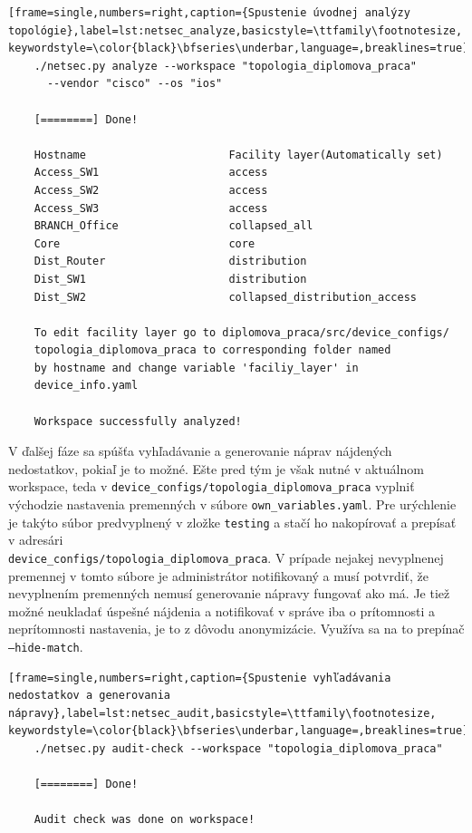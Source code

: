 \begin{minipage}{\linewidth}		
	\begin{lstlisting}[frame=single,numbers=right,caption={Spustenie úvodnej analýzy topológie},label=lst:netsec_analyze,basicstyle=\ttfamily\footnotesize, keywordstyle=\color{black}\bfseries\underbar,language=,breaklines=true]
	./netsec.py analyze --workspace "topologia_diplomova_praca" 
	  --vendor "cisco" --os "ios"
	
	[========] Done!
	
	Hostname                      Facility layer(Automatically set)
	Access_SW1                    access
	Access_SW2                    access
	Access_SW3                    access
	BRANCH_Office                 collapsed_all
	Core                          core
	Dist_Router                   distribution
	Dist_SW1                      distribution
	Dist_SW2                      collapsed_distribution_access
	
	To edit facility layer go to diplomova_praca/src/device_configs/
	topologia_diplomova_praca to corresponding folder named 
	by hostname and change variable 'faciliy_layer' in 
	device_info.yaml
	
	Workspace successfully analyzed!
	\end{lstlisting}
\end{minipage}
\newpage
\vspace{2em}
V ďalšej fáze sa spúšťa vyhľadávanie a generovanie náprav nájdených nedostatkov, pokiaľ je to možné. Ešte pred tým je však nutné v aktuálnom workspace, teda v \texttt{device\_configs/topologia\_diplomova\_praca} vyplniť východzie nastavenia premenných v súbore \texttt{own\_variables.yaml}. Pre urýchlenie je takýto súbor predvyplnený v zložke \texttt{testing} a stačí ho nakopírovať a prepísať v adresári\\ \texttt{device\_configs/topologia\_diplomova\_praca}. V prípade nejakej nevyplnenej premennej v tomto súbore je administrátor notifikovaný a musí potvrdiť, že nevyplnením premenných nemusí generovanie nápravy fungovať ako má. Je tiež možné neukladať úspešné nájdenia a notifikovať v správe iba o prítomnosti a neprítomnosti nastavenia, je to z dôvodu anonymizácie. Využíva sa na to prepínač \texttt{---hide-match}.

\begin{minipage}{\linewidth}		
	\begin{lstlisting}[frame=single,numbers=right,caption={Spustenie vyhľadávania nedostatkov a generovania nápravy},label=lst:netsec_audit,basicstyle=\ttfamily\footnotesize, keywordstyle=\color{black}\bfseries\underbar,language=,breaklines=true]
	./netsec.py audit-check --workspace "topologia_diplomova_praca"
	
    [========] Done!
    
    Audit check was done on workspace!
	\end{lstlisting}
\end{minipage}


